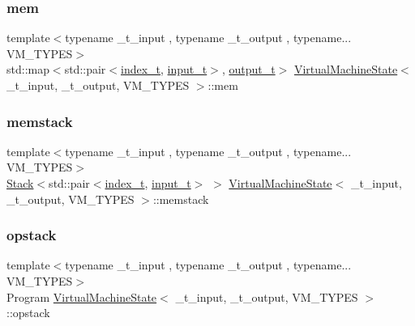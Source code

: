 \mbox{\label{class_virtual_machine_state_a8f36d4040b98a1e85fb7edf61e6085c9}} 
\subsubsection{\texorpdfstring{mem}{mem}}
{\footnotesize\ttfamily template$<$typename \+\_\+t\+\_\+input , typename \+\_\+t\+\_\+output , typename... V\+M\+\_\+\+T\+Y\+P\+ES$>$ \\
std\+::map$<$std\+::pair$<$\hyperlink{class_virtual_machine_state_a95ba2f54f65b778c8a012ea3e7a0ee50}{index\+\_\+t}, \hyperlink{class_virtual_machine_state_a04c5592dddd5b9ffdae5a509d73127dd}{input\+\_\+t}$>$, \hyperlink{class_virtual_machine_state_a005a025f97d9505b00e7f9f0e99002bb}{output\+\_\+t}$>$ \hyperlink{class_virtual_machine_state}{Virtual\+Machine\+State}$<$ \+\_\+t\+\_\+input, \+\_\+t\+\_\+output, V\+M\+\_\+\+T\+Y\+P\+ES $>$\+::mem}

\mbox{\label{class_virtual_machine_state_af7a7d7f942825d6f819a791dcb53617b}} 
\subsubsection{\texorpdfstring{memstack}{memstack}}
{\footnotesize\ttfamily template$<$typename \+\_\+t\+\_\+input , typename \+\_\+t\+\_\+output , typename... V\+M\+\_\+\+T\+Y\+P\+ES$>$ \\
\hyperlink{class_stack}{Stack}$<$std\+::pair$<$\hyperlink{class_virtual_machine_state_a95ba2f54f65b778c8a012ea3e7a0ee50}{index\+\_\+t}, \hyperlink{class_virtual_machine_state_a04c5592dddd5b9ffdae5a509d73127dd}{input\+\_\+t}$>$ $>$ \hyperlink{class_virtual_machine_state}{Virtual\+Machine\+State}$<$ \+\_\+t\+\_\+input, \+\_\+t\+\_\+output, V\+M\+\_\+\+T\+Y\+P\+ES $>$\+::memstack}

\mbox{\label{class_virtual_machine_state_af154a184be7061c9fc1ee7fa875cffa0}} 
\subsubsection{\texorpdfstring{opstack}{opstack}}
{\footnotesize\ttfamily template$<$typename \+\_\+t\+\_\+input , typename \+\_\+t\+\_\+output , typename... V\+M\+\_\+\+T\+Y\+P\+ES$>$ \\
Program \hyperlink{class_virtual_machine_state}{Virtual\+Machine\+State}$<$ \+\_\+t\+\_\+input, \+\_\+t\+\_\+output, V\+M\+\_\+\+T\+Y\+P\+ES $>$\+::opstack}

